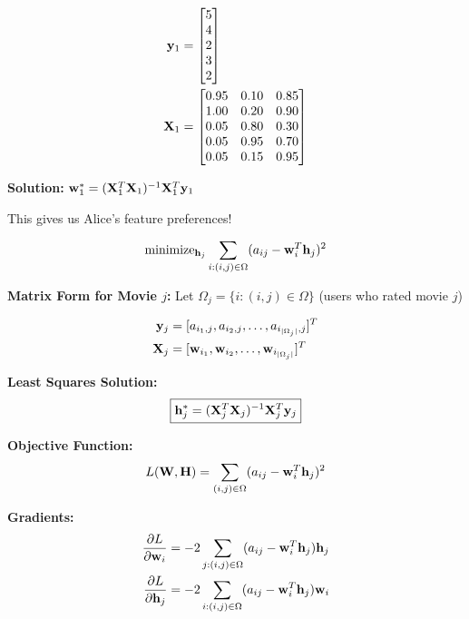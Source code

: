 \documentclass{beamer}
\begin{document}
\begin{frame}\begin{align}
\mathbf{y}_1 &= \begin{bmatrix} 5 \\ 4 \\ 2 \\ 3 \\ 2 \end{bmatrix} \\
\mathbf{X}_1 &= \begin{bmatrix} 
0.95 & 0.10 & 0.85 \\
1.00 & 0.20 & 0.90 \\
0.05 & 0.80 & 0.30 \\
0.05 & 0.95 & 0.70 \\
0.05 & 0.15 & 0.95
\end{bmatrix}
\end{align}

\pause
\textbf{Solution:} $\mathbf{w}_1^* = (\mathbf{X}_1^T \mathbf{X}_1)^{-1} \mathbf{X}_1^T \mathbf{y}_1$

This gives us Alice's feature preferences!
\end{frame}

\begin{frame}\begin{equation*}
\operatorname{minimize}_{\mathbf{h}_j} \sum_{i: (i,j) \in \Omega} (a_{ij} - \mathbf{w}_i^T \mathbf{h}_j)^2
\end{equation*}

\pause
\textbf{Matrix Form for Movie $j$:}
Let $\Omega_j = \{i: (i,j) \in \Omega\}$ (users who rated movie $j$)

\pause
\begin{align}
\mathbf{y}_j &= [a_{i_1,j}, a_{i_2,j}, \ldots, a_{i_{|\Omega_j|},j}]^T \\
\mathbf{X}_j &= [\mathbf{w}_{i_1}, \mathbf{w}_{i_2}, \ldots, \mathbf{w}_{i_{|\Omega_j|}}]^T
\end{align}

\pause
\textbf{Least Squares Solution:}
\begin{equation*}
\boxed{\mathbf{h}_j^* = (\mathbf{X}_j^T \mathbf{X}_j)^{-1} \mathbf{X}_j^T \mathbf{y}_j}
\end{equation*}
\end{frame}

\begin{frame}\textbf{Objective Function:}
\begin{equation*}
L(\mathbf{W}, \mathbf{H}) = \sum_{(i,j) \in \Omega} (a_{ij} - \mathbf{w}_i^T \mathbf{h}_j)^2
\end{equation*}

\pause
\textbf{Gradients:}
\begin{align}
\frac{\partial L}{\partial \mathbf{w}_i} &= -2 \sum_{j: (i,j) \in \Omega} (a_{ij} - \mathbf{w}_i^T \mathbf{h}_j) \mathbf{h}_j \\
\frac{\partial L}{\partial \mathbf{h}_j} &= -2 \sum_{i: (i,j) \in \Omega} (a_{ij} - \mathbf{w}_i^T \mathbf{h}_j) \mathbf{w}_i
\end{align}
\end{frame}
\end{document}

